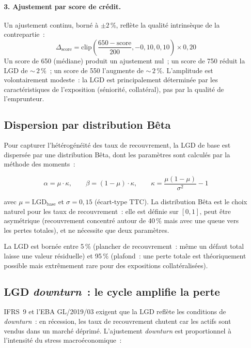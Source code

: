 \documentclass[12pt, a4paper, twoside, openright]{report}
\theoremstyle{definition}
\begin{document}
\paragraph{3. Ajustement par score de crédit.} Un ajustement continu, borné à $\pm 2\,\%$, reflète la qualité intrinsèque de la contrepartie~:
\begin{equation}
\Delta_{\text{score}} = \text{clip}\!\left(\frac{650 - \text{score}}{200}, -0{,}10, 0{,}10\right) \times 0{,}20
\label{eq:lgd-score}
\end{equation}
Un score de 650 (médiane) produit un ajustement nul~; un score de 750 réduit la LGD de ${\sim}\,2\,\%$~; un score de 550 l'augmente de ${\sim}\,2\,\%$. L'amplitude est volontairement modeste~: la LGD est principalement déterminée par les caractéristiques de l'exposition (séniorité, collatéral), pas par la qualité de l'emprunteur.

\subsection{Dispersion par distribution Bêta}

Pour capturer l'hétérogénéité des taux de recouvrement, la LGD de base est dispersée par une distribution Bêta, dont les paramètres sont calculés par la méthode des moments~:

\begin{equation}
\alpha = \mu \cdot \kappa, \qquad \beta = (1 - \mu) \cdot \kappa, \qquad \kappa = \frac{\mu(1-\mu)}{\sigma^2} - 1
\label{eq:beta-params}
\end{equation}

\noindent avec $\mu = \text{LGD}_{\text{base}}$ et $\sigma = 0{,}15$ (écart-type TTC). La distribution Bêta est le choix naturel pour les taux de recouvrement~: elle est définie sur $[0, 1]$, peut être asymétrique (recouvrement concentré autour de 40\,\% mais avec une queue vers les pertes totales), et ne nécessite que deux paramètres.

La LGD est bornée entre 5\,\% (plancher de recouvrement~: même un défaut total laisse une valeur résiduelle) et 95\,\% (plafond~: une perte totale est théoriquement possible mais extrêmement rare pour des expositions collatéralisées).

\subsection{LGD \emph{downturn}~: le cycle amplifie la perte}

IFRS~9 et l'EBA GL/2019/03 exigent que la LGD reflète les conditions de \emph{downturn}~: en récession, les taux de recouvrement chutent car les actifs sont vendus dans un marché déprimé. L'ajustement \emph{downturn} est proportionnel à l'intensité du stress macroéconomique~:
\end{document}
